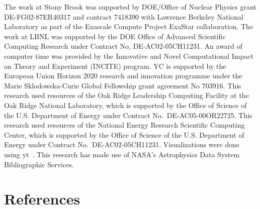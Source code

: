 \documentclass[a4paper]{jpconf}
\begin{document}
\ack The work at Stony Brook was supported by DOE/Office of Nuclear
Physics grant DE-FG02-87ER40317 and contract 7418390 with Lawrence
Berkeley National Laboratory as part of the Exascale Compute Project
ExaStar collaboration.  The work at LBNL was supported by the DOE
Office of Advanced Scientific Computing Research under Contract No,
DE-AC02-05CH11231. An award of computer time was provided by the
Innovative and Novel Computational Impact on Theory and Experiment
(INCITE) program. YC is supported by the European Union Horizon 2020
research and innovation programme under the Marie Sklodowska-Curie
Global Fellowship grant agreement No 703916. This research used
resources of the Oak Ridge Leadership Computing Facility at the Oak
Ridge National Laboratory, which is supported by the Office of Science
of the U.S. Department of Energy under Contract
No.\ DE-AC05-00OR22725.  This research used resources of the National
Energy Research Scientific Computing Center, which is supported by the
Office of Science of the U.S. Department of Energy under Contract
No.\ DE-AC02-05CH11231.  Visualizations were done using yt~\cite{yt}.
This research has made use of NASA's Astrophysics Data System
Bibliographic Services.


\section*{References}



\end{document}
